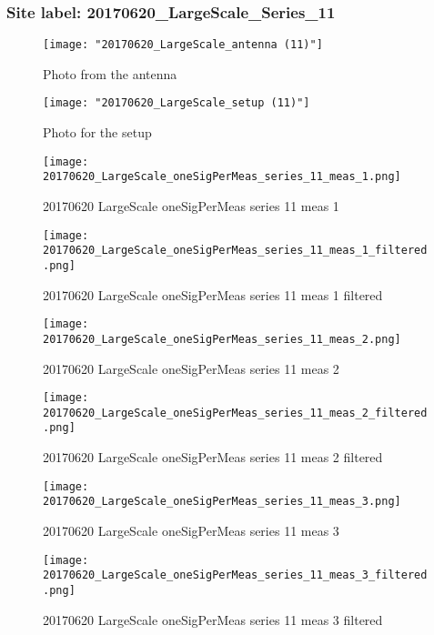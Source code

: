 \subsubsection{Site label: 20170620\_LargeScale\_Series\_11}
\begin{figure}[ht] \caption{Photo from the antenna}
\texttt{[image: "20170620\_LargeScale\_antenna (11)"]}\centering\end{figure}
\begin{figure}[ht] \caption{Photo for the setup}
\texttt{[image: "20170620\_LargeScale\_setup (11)"]}\centering\end{figure}
\begin{figure}[ht] \caption{20170620 LargeScale oneSigPerMeas series 11 meas 1}
\texttt{[image: 20170620\_LargeScale\_oneSigPerMeas\_series\_11\_meas\_1.png]}\centering\end{figure}
\begin{figure}[ht] \caption{20170620 LargeScale oneSigPerMeas series 11 meas 1 filtered}
\texttt{[image: 20170620\_LargeScale\_oneSigPerMeas\_series\_11\_meas\_1\_filtered.png]}\centering\end{figure}
\begin{figure}[ht] \caption{20170620 LargeScale oneSigPerMeas series 11 meas 2}
\texttt{[image: 20170620\_LargeScale\_oneSigPerMeas\_series\_11\_meas\_2.png]}\centering\end{figure}
\begin{figure}[ht] \caption{20170620 LargeScale oneSigPerMeas series 11 meas 2 filtered}
\texttt{[image: 20170620\_LargeScale\_oneSigPerMeas\_series\_11\_meas\_2\_filtered.png]}\centering\end{figure}
\begin{figure}[ht] \caption{20170620 LargeScale oneSigPerMeas series 11 meas 3}
\texttt{[image: 20170620\_LargeScale\_oneSigPerMeas\_series\_11\_meas\_3.png]}\centering\end{figure}
\begin{figure}[ht] \caption{20170620 LargeScale oneSigPerMeas series 11 meas 3 filtered}
\texttt{[image: 20170620\_LargeScale\_oneSigPerMeas\_series\_11\_meas\_3\_filtered.png]}\centering\end{figure}
\clearpage
